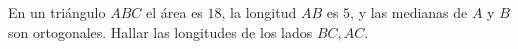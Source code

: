 En un triángulo $ABC$ el área es $18$, la longitud $AB$ es $5$, y las medianas de $A$ y $B$ son ortogonales. Hallar las longitudes de los lados $BC,AC$.
